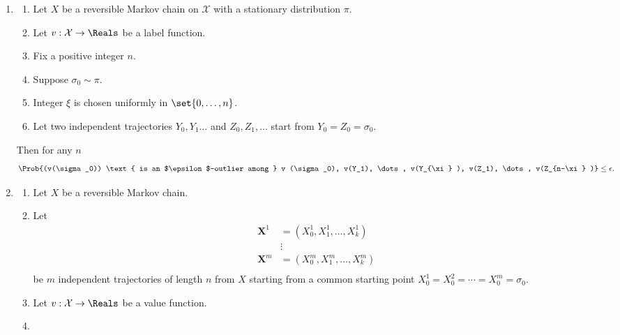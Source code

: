 \documentclass[12pt]{article}
\begin{document}
\begin{enumerate}
\begin{theorem}
\end{theorem}
  \item \begin{theorem}
    \label{thm:parallelsignificance:bc1}
    \begin{enumerate}
        \item
            Let \( X \) be a reversible Markov chain on \( \mathcal{X} \)
            with a stationary distribution \( \pi \).
        \item
            Let \( v :  \mathcal{X} \to \Reals \) be a label function.
        \item
            Fix a positive integer \( n \).
        \item
            Suppose  \( \sigma_0 \sim \pi \).
        \item
            Integer \( \xi \) is chosen uniformly in \( \set{0,\dots, n}
            \).
        \item
            Let two independent trajectories \( Y_0 , Y_1 \dots \) and \(
            Z_0, Z_1, \dots \) start from \( Y_0 = Z_0 = \sigma_0 \).
    \end{enumerate}
    Then for any \( n \)
    \[
        \Prob{(v(\sigma_0)) \text{ is an $\epsilon$-outlier among } v
        (\sigma_0), v(Y_1), \dots, v(Y_{\xi} ), v(Z_1), \dots, v(Z_{n-\xi}
        )} \le \epsilon.
    \]
\end{theorem}
  \item \begin{theorem}
    \label{thm:parallelsignificance:thm3point1}
    \begin{enumerate}
        \item
            Let \( X \) be a reversible Markov chain.
        \item
            Let
            \begin{align*}
                \mathbf{X}^1 &= (X_0^1, X_1^1, \dots, X_k^1 )\\
                &\vdots \\
                \mathbf{X}^m &= (X_0^m, X_1^m, \dots, X_k^m )\\
            \end{align*}
            be \( m \) independent trajectories of length \( n \) from \(
            X \) starting from a common starting point \( X_0^1 =
            X_0^2 = \cdots = X_0^m = \sigma_0 \). 
        \item
            Let \( v :  \mathcal{X} \to \Reals \) be a value function.
        \item

\end{enumerate}
\end{theorem}
\end{enumerate}
\end{document}
